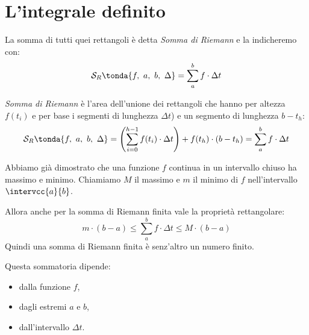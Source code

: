 \section{L'integrale definito}
\label{sec:integrali_definizione}


La somma di tutti quei rettangoli è detta \emph{Somma di Riemann} e
la indicheremo con: 
\[\mathcal{S}_R \tonda{f,~a,~b,~\Delta} = \sum_a^b f \cdot \Delta t\]
\begin{newdef}{}{}
\emph{Somma di Riemann} è l'area dell'unione dei rettangoli che 
hanno per altezza \(f(t_i)\) e per base i segmenti di lunghezza 
\(\Delta t\)) e un segmento di lunghezza \(b - t_{h}\): 
\[\mathcal{S}_R \tonda{f,~a,~b,~\Delta} = 
\left(\sum_{i=0}^{h-1} f(t_i)\cdot\Delta t \right)+f(t_h)\cdot(b-t_h) = 
\sum_a^b f \cdot \Delta t\] 
\end{newdef}

Abbiamo già dimostrato che una funzione \(f\) continua in 
un intervallo chiuso ha massimo e minimo. 
Chiamiamo \(M\) il massimo e \(m\) il minimo di \(f\) nell'intervallo 
\(\intervcc{a}{b}\).

Allora anche per la somma di Riemann finita vale la proprietà rettangolare: 
\[m\cdot(b - a) \le \sum_a^b f \cdot\Delta t \le M\cdot(b - a)\] 
Quindi una somma di Riemann finita è senz'altro un numero finito.

Questa sommatoria dipende:

\vspace{-1em}
\begin{multicols}{3} 
\begin{itemize} [nosep]
 \item dalla funzione \(f\),
 \item dagli estremi \(a\) e \(b\),
 \item dall'intervallo \(\Delta t\).
\end{itemize}
\end{multicols}

